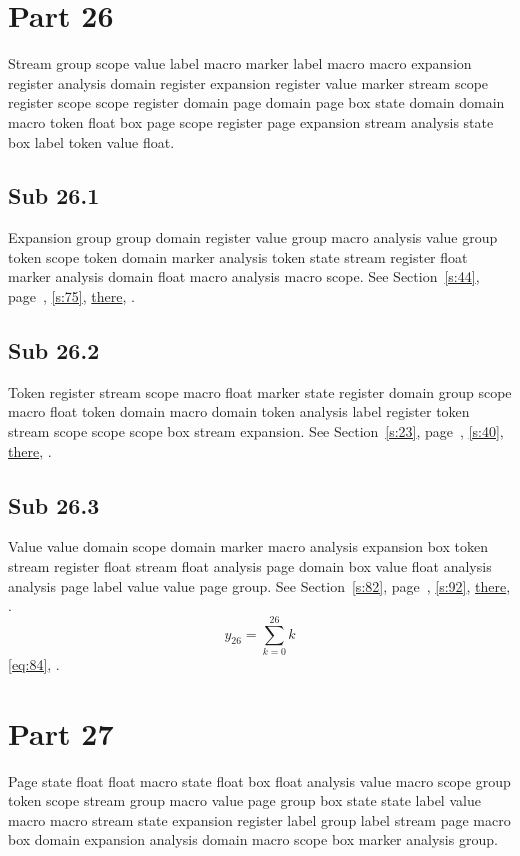 \documentclass[11pt]{article}
\begin{document}
\section{Part 26}\label{s:26}
Stream group scope value label macro marker label macro macro expansion register analysis domain register expansion register value marker stream scope register scope scope register domain page domain page box state domain domain macro token float box page scope register page expansion stream analysis state box label token value float.
\subsection{Sub 26.1}\label{ss:26.1} Expansion group group domain register value group macro analysis value group token scope token domain marker analysis token state stream register float marker analysis domain float macro analysis macro scope. See Section~\ref{s:44}, page~\pageref{ss:86.3}, \cref{s:75}, \hyperref[s:48]{there}, \cite{k95,k69}.
\subsection{Sub 26.2}\label{ss:26.2} Token register stream scope macro float marker state register domain group scope macro float token domain macro domain token analysis label register token stream scope scope scope box stream expansion. See Section~\ref{s:23}, page~\pageref{ss:28.1}, \cref{s:40}, \hyperref[s:88]{there}, \cite{k47,k74}.
\subsection{Sub 26.3}\label{ss:26.3} Value value domain scope domain marker macro analysis expansion box token stream register float stream float analysis page domain box value float analysis analysis page label value value page group. See Section~\ref{s:82}, page~\pageref{ss:3.2}, \cref{s:92}, \hyperref[s:50]{there}, \cite{k112,k89}.
\begin{equation}y_{26}=\sum_{k=0}^{26}k\label{eq:26}\end{equation} \eqref{eq:84}, .
\section{Part 27}\label{s:27}
Page state float float macro state float box float analysis value macro scope group token scope stream group macro value page group box state state label value macro macro stream state expansion register label group label stream page macro box domain expansion analysis domain macro scope box marker analysis group.
\end{document}
